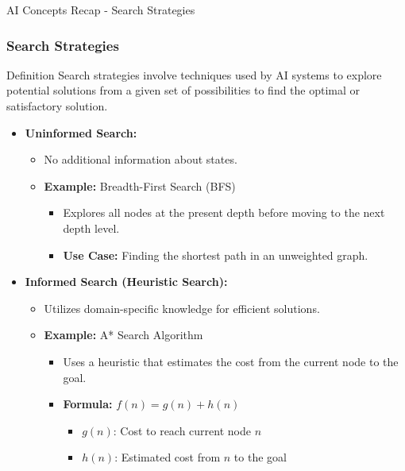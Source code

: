 \documentclass[aspectratio=169]{beamer}
\begin{document}
\begin{frame}[fragile]{AI Concepts Recap - Search Strategies}
    \frametitle{Search Strategies}

    \begin{block}{Definition}
        Search strategies involve techniques used by AI systems to explore potential solutions from a given set of possibilities to find the optimal or satisfactory solution.
    \end{block}

    \begin{itemize}
        \item \textbf{Uninformed Search:}
            \begin{itemize}
                \item No additional information about states.
                \item \textbf{Example:} Breadth-First Search (BFS)
                    \begin{itemize}
                        \item Explores all nodes at the present depth before moving to the next depth level. 
                        \item \textbf{Use Case:} Finding the shortest path in an unweighted graph.
                    \end{itemize}
            \end{itemize}

        \item \textbf{Informed Search (Heuristic Search):}
            \begin{itemize}
                \item Utilizes domain-specific knowledge for efficient solutions.
                \item \textbf{Example:} A* Search Algorithm
                    \begin{itemize}
                        \item Uses a heuristic that estimates the cost from the current node to the goal.
                        \item \textbf{Formula:} \( f(n) = g(n) + h(n) \)
                            \begin{itemize}
                                \item \( g(n) \): Cost to reach current node \( n \)
                                \item \( h(n) \): Estimated cost from \( n \) to the goal
                            \end{itemize}
                    \end{itemize}
            \end{itemize}
    \end{itemize}
\end{frame}
\end{document}
